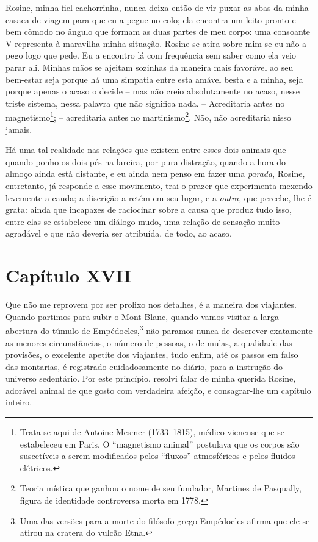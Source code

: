  Rosine, minha fiel cachorrinha, nunca deixa então de vir puxar as abas
da minha casaca de viagem para que eu a pegue no colo; ela encontra um
leito pronto e bem cômodo no ângulo que formam as duas partes de meu
corpo: uma consoante V representa à maravilha minha situação. Rosine se
atira sobre mim se eu não a pego logo que pede. Eu a encontro lá com
frequência sem saber como ela veio parar ali. Minhas mãos se ajeitam
sozinhas da maneira mais favorável ao seu bem-estar seja porque há uma
simpatia entre esta amável besta e a minha, seja porque apenas o acaso
o decide -- mas não creio absolutamente no acaso, nesse triste
sistema, nessa palavra que não significa nada. -- Acreditaria antes no
magnetismo\footnote{ Trata-se aqui de Antoine Mesmer (1733--1815),
médico vienense que se estabeleceu em Paris. O ``magnetismo animal''
postulava que os corpos são suscetíveis a serem modificados pelos
``fluxos'' atmosféricos e pelos fluidos elétricos.}; -- acreditaria
antes no martinismo\footnote{ Teoria mística que ganhou o nome de seu
fundador, Martines de Pasqually, figura de identidade controversa morta
em 1778.}. Não, não acreditaria nisso jamais. 

 Há uma tal realidade nas relações que existem entre esses dois animais
que quando ponho os dois pés na lareira, por pura distração, quando a
hora do almoço ainda está distante, e eu ainda nem penso em fazer uma
\textit{parada}, Rosine, entretanto, já responde a esse movimento, trai
o prazer que experimenta mexendo levemente a cauda; a discrição a retém
em seu lugar, e a \textit{outra}, que percebe, lhe é grata: ainda que
incapazes de raciocinar sobre a causa que produz tudo isso, entre elas
se estabelece um diálogo mudo, uma relação de sensação muito agradável
e que não deveria ser atribuída, de todo, ao acaso. 

\section{Capítulo XVII}

 Que não me reprovem por ser prolixo nos detalhes, é a maneira dos
viajantes. Quando partimos para subir o Mont Blanc, quando vamos
visitar a larga abertura do túmulo de Empédocles,\footnote{ Uma das
versões para a morte do filósofo grego Empédocles afirma que ele se
atirou na cratera do vulcão Etna.} não paramos nunca de descrever
exatamente as menores circunstâncias, o número de pessoas, o de mulas,
a qualidade das provisões, o excelente apetite dos viajantes, tudo
enfim, até os passos em falso das montarias, é registrado
cuidadosamente no diário, para a instrução do universo sedentário. Por
este princípio, resolvi falar de minha querida Rosine, adorável animal
de que gosto com verdadeira afeição, e consagrar-lhe um capítulo
inteiro. 

